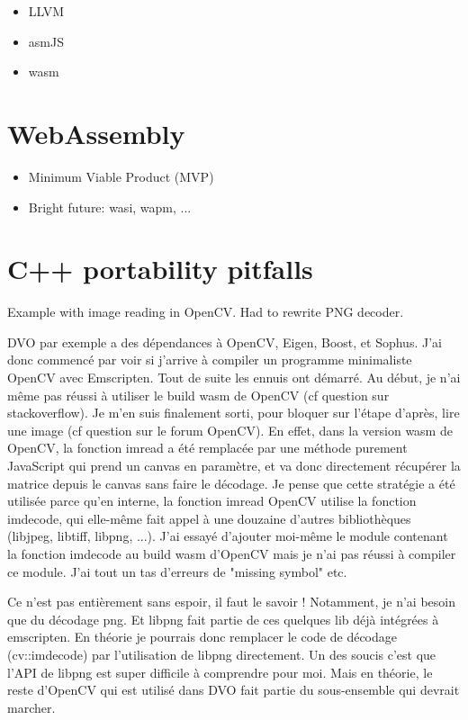 \begin{itemize}
	\item LLVM
	\item asmJS
	\item wasm
\end{itemize}

\section{WebAssembly}%
\label{sec:WebAssembly}

\begin{itemize}
	\item Minimum Viable Product (MVP)
	\item Bright future: wasi, wapm, ...
\end{itemize}

\section{C++ portability pitfalls}%
\label{sec:cpp_pitfalls}

Example with image reading in OpenCV.
Had to rewrite PNG decoder.


DVO par exemple a des dépendances à OpenCV, Eigen, Boost, et Sophus. J’ai donc commencé par voir si j’arrive à compiler un programme minimaliste OpenCV avec Emscripten. Tout de suite les ennuis ont démarré. Au début, je n’ai même pas réussi à utiliser le build wasm de OpenCV (cf question sur stackoverflow). Je m’en suis finalement sorti, pour bloquer sur l’étape d’après, lire une image (cf question sur le forum OpenCV). En effet, dans la version wasm de OpenCV, la fonction imread a été remplacée par une méthode purement JavaScript qui prend un canvas en paramètre, et va donc directement récupérer la matrice depuis le canvas sans faire le décodage. Je pense que cette stratégie a été utilisée parce qu’en interne, la fonction imread OpenCV utilise la fonction imdecode, qui elle-même fait appel à une douzaine d’autres bibliothèques (libjpeg, libtiff, libpng, ...). J’ai essayé d’ajouter moi-même le module contenant la fonction imdecode au build wasm d’OpenCV mais je n’ai pas réussi à compiler ce module. J’ai tout un tas d’erreurs de "missing symbol" etc.

Ce n’est pas entièrement sans espoir, il faut le savoir ! Notamment, je n’ai besoin que du décodage png. Et libpng fait partie de ces quelques lib déjà intégrées à emscripten. En théorie je pourrais donc remplacer le code de décodage (cv::imdecode) par l’utilisation de libpng directement. Un des soucis c’est que l’API de libpng est super difficile à comprendre pour moi. Mais en théorie, le reste d’OpenCV qui est utilisé dans DVO fait partie du sous-ensemble qui devrait marcher.

